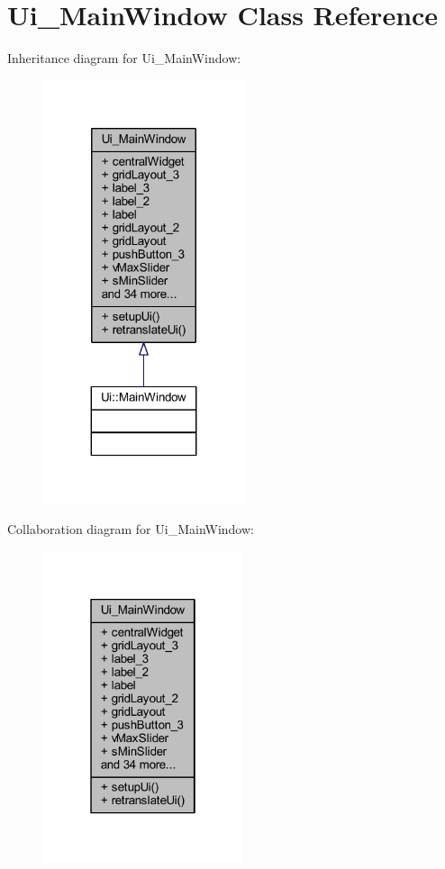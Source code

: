 \hypertarget{class_ui___main_window}{}\section{Ui\+\_\+\+Main\+Window Class Reference}
\label{class_ui___main_window}


Inheritance diagram for Ui\+\_\+\+Main\+Window\+:\nopagebreak
\begin{figure}[H]
\begin{center}
\leavevmode
\includegraphics[width=167pt]{dd/df1/class_ui___main_window__inherit__graph}
\end{center}
\end{figure}


Collaboration diagram for Ui\+\_\+\+Main\+Window\+:\nopagebreak
\begin{figure}[H]
\begin{center}
\leavevmode
\includegraphics[width=166pt]{d5/d21/class_ui___main_window__coll__graph}
\end{center}
\end{figure}
